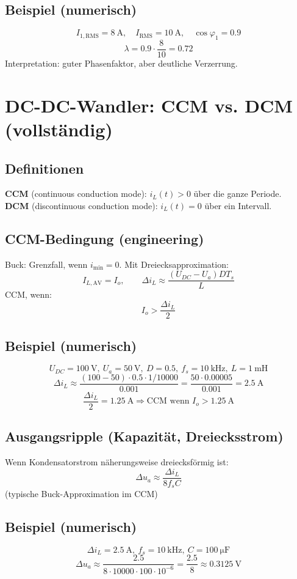 \documentclass[a4paper,11pt]{article}
\begin{document}
\subsection*{Beispiel (numerisch)}
\[
I_{1,\mathrm{RMS}}=\SI{8}{\ampere},\quad I_{\mathrm{RMS}}=\SI{10}{\ampere},\quad \cos\varphi_1=0.9
\]
\[
\lambda=0.9\cdot \frac{8}{10}=0.72
\]
Interpretation: guter Phasenfaktor, aber deutliche Verzerrung.

\section{DC-DC-Wandler: CCM vs. DCM (vollständig)}

\subsection{Definitionen}
\textbf{CCM} (continuous conduction mode): $i_L(t)>0$ über die ganze Periode.\\
\textbf{DCM} (discontinuous conduction mode): $i_L(t)=0$ über ein Intervall.

\subsection{CCM-Bedingung (engineering)}
Buck: Grenzfall, wenn $i_{\min}=0$. Mit Dreiecksapproximation:
\[
I_{L,\mathrm{AV}} = I_o,\qquad \Delta i_L \approx \frac{(U_{DC}-U_a)D T_s}{L}
\]
CCM, wenn:
\[
I_o > \frac{\Delta i_L}{2}
\]

\subsection*{Beispiel (numerisch)}
\[
U_{DC}=\SI{100}{\volt},\ U_a=\SI{50}{\volt},\ D=0.5,\ f_s=\SI{10}{\kilo\hertz},\ L=\SI{1}{\milli\henry}
\]
\[
\Delta i_L \approx \frac{(100-50)\cdot 0.5 \cdot 1/10000}{0.001}
= \frac{50\cdot 0.00005}{0.001}=\SI{2.5}{\ampere}
\]
\[
\frac{\Delta i_L}{2}=\SI{1.25}{\ampere}
\Rightarrow \text{CCM wenn } I_o>1.25\ \mathrm{A}
\]

\subsection{Ausgangsripple (Kapazität, Dreiecksstrom)}
Wenn Kondensatorstrom näherungsweise dreiecksförmig ist:
\[
\Delta u_a \approx \frac{\Delta i_L}{8 f_s C}
\]
(typische Buck-Approximation im CCM)

\subsection*{Beispiel (numerisch)}
\[
\Delta i_L=\SI{2.5}{\ampere},\ f_s=\SI{10}{\kilo\hertz},\ C=\SI{100}{\micro\farad}
\]
\[
\Delta u_a \approx \frac{2.5}{8\cdot 10000\cdot 100\cdot 10^{-6}}
=\frac{2.5}{8}\approx \SI{0.3125}{\volt}
\]
\end{document}
